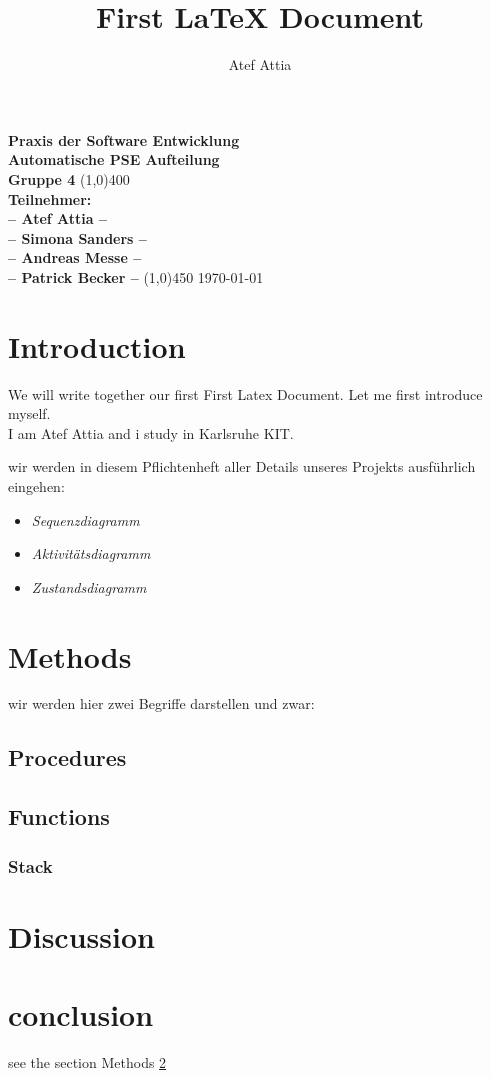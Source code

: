 \documentclass[parskip=full]{scrartcl}
\title{First LaTeX Document}
\author{Atef Attia}
\begin{document}
\begin{titlepage}
\begin{center}
\vspace*{1cm}
\Huge{\textbf{Praxis der Software Entwicklung\\ Automatische PSE Aufteilung\\ Gruppe 4}}
\vfill
\line(1,0){400}\\[2mm]
\huge{\textbf{Teilnehmer: }}\\
\Large{\textbf{-- Atef Attia --}}\\
\Large{\textbf{-- Simona Sanders --}}\\
\Large{\textbf{-- Andreas Messe --}}\\
\Large{\textbf{-- Patrick Becker --}}
\line(1,0){450}
\vfill
\today
\end{center}
\end{titlepage}


\section{Introduction}
\begin{large}
We will write together our first First Latex Document. Let me first introduce myself.\\
I am Atef Attia and i study in Karlsruhe KIT.

wir werden in diesem Pflichtenheft aller Details unseres Projekts ausführlich eingehen:
\begin{itemize}
\item \textit{\Large{Sequenzdiagramm}}
\item \textit{\Large{Aktivitätsdiagramm}}
\item \textit{\Large{Zustandsdiagramm}}
\end{itemize}
\end{large}
\section{Methods}\label{sec:method}
\begin{large}
wir werden hier zwei Begriffe darstellen und zwar:\\
\end{large}
\subsection{Procedures}

\subsection{Functions}
\subsubsection {Stack}

\section{Discussion}


\section{conclusion}
see the section Methods \ref{sec:method}
\end{document}
